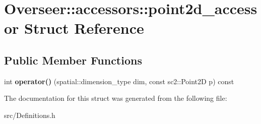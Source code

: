 \hypertarget{structOverseer_1_1accessors_1_1point2d__accessor}{}\section{Overseer\+:\+:accessors\+:\+:point2d\+\_\+accessor Struct Reference}
\label{structOverseer_1_1accessors_1_1point2d__accessor}
\subsection*{Public Member Functions}
\begin{DoxyCompactItemize}
\item 
\mbox{\label{structOverseer_1_1accessors_1_1point2d__accessor_aa698247566da77479df81656067ec995}} 
int {\bfseries operator()} (spatial\+::dimension\+\_\+type dim, const sc2\+::\+Point2D p) const
\end{DoxyCompactItemize}


The documentation for this struct was generated from the following file\+:\begin{DoxyCompactItemize}
\item 
src/Definitions.\+h\end{DoxyCompactItemize}
